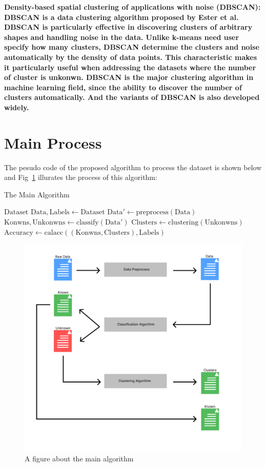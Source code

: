 \documentclass[twocolumn,10pt]{article}
\begin{document}
\bf{Density-based spatial clustering of applications with noise (DBSCAN)}: \rm{DBSCAN} is a data clustering 
algorithm proposed by Ester et al. \cite{10.5555/3001460.3001507} DBSCAN is particularly effective in 
discovering clusters of arbitrary shapes and handling noise in the data. Unlike k-means need user specify 
how many clusters, DBSCAN determine the clusters and noise automatically by the density of data points. 
This characteristic makes it particularly useful when addressing the datasets where the number of cluster 
is unkonwn. DBSCAN is the major clustering algorithm in machine learning field, since the ability to 
discover the number of clusters automatically. And the variants of DBSCAN \cite{6814687} is also developed widely. 

\section{Main Process}
  The pesudo code of the proposed algorithm to process the dataset is shown below and Fig~\ref{fig:Main_Algo} 
  illurates the process of this algorithm:
  \begin{algorithm}
    \caption{The Main Algorithm}\label{alg:main}
    \begin{algorithmic}[1]
      \Require $\text{Dataset}$
      \State $\text{Data}, \text{Labels} \gets \text{Dataset}$
      \State $\text{Data}' \gets \text{preprocess}(\text{Data})$
      \State $\text{Konwns}, \text{Unkonwns} \gets \text{classify}(\text{Data}')$
      \State $\text{Clusters} \gets \text{clustering}(\text{Unkonwns})$
      \State $\text{Accuracy} \gets \text{calacc}((\text{Konwns}, \text{Clusters}), \text{Labels})$
    \end{algorithmic}
  \end{algorithm}

  \begin{figure}[htb]
    \centering
    \includegraphics[scale=0.20]{assets/Main_Algo.pdf}
    \caption{A figure about the main algorithm}
    \label{fig:Main_Algo}
  \end{figure}
\end{document}
